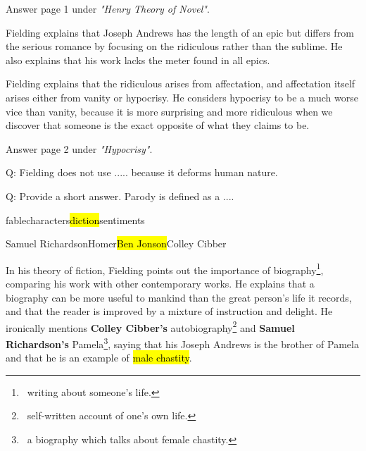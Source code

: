 \documentclass[12pt, a4paper]{article}
\begin{document}
Answer page 1 under \textit{"Henry Theory of Novel"}.



Fielding explains that Joseph Andrews has
the length of an epic but differs from the serious romance by focusing on the ridiculous rather than the sublime.
He also explains that his work lacks the meter found in all epics.


Fielding explains that the ridiculous arises from affectation, and 
affectation itself arises either from vanity or hypocrisy. He considers hypocrisy to be a 
much worse vice than vanity, because it is more surprising and more ridiculous 
when we discover that someone is the exact opposite of what they claims to be.



Answer page 2 under \textit{"Hypocrisy"}.

{Q: Fielding does not use ..... because it deforms human nature.}


{Q: Provide a short answer. Parody is defined as a ....}



{fable}{characters}{\hl{diction}}{sentiments}

{Samuel Richardson}{Homer}{\hl{Ben Jonson}}{Colley Cibber}


\ind In his theory of fiction, Fielding points out the importance of biography\footnote{
\, writing about someone's life.}, comparing his work with other contemporary works.
He explains that a biography can be more useful to mankind than the great person's
life it records, and that the reader is improved by a mixture of instruction and delight.
He ironically mentions \textbf{Colley Cibber's} autobiography\footnote{\, self-written account of one's own life.}
and \textbf{Samuel Richardson's} Pamela\footnote{\, a biography which talks about female chastity.},
saying that his Joseph Andrews is the brother of Pamela and
that he is an example of \hl{male chastity}.
\end{document}
